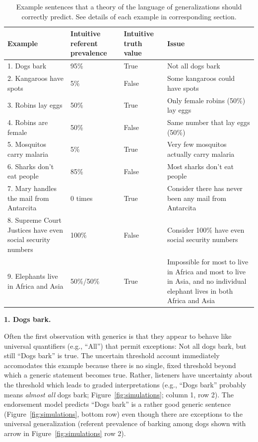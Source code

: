 \documentclass[english,,man,floatsintext]{apa6}
\theoremstyle{definition}
\theoremstyle{definition}
\theoremstyle{definition}
\theoremstyle{remark}
\begin{document}
\begin{table}[ht]
\centering
\begingroup\fontsize{9pt}{10pt}\selectfont
\begin{tabular}{p{2in}|  |p{1.25in}|p{0.75in}|p{2in} |}
  \hline
{\bfseries Example} & {\bfseries Intuitive referent prevalence} & {\bfseries Intuitive truth value} & {\bfseries Issue} \\ 
  \hline
1. Dogs bark & 95\% & True & Not all dogs bark \\ 
   \hline
2. Kangaroos have spots & 5\% & False & Some kangaroos could have spots \\ 
   \hline
3. Robins lay eggs & 50\% & True & Only female robins (50\%) lay eggs \\ 
   \hline
4. Robins are female & 50\% & False & Same number that lay eggs (50\%) \\ 
   \hline
5. Mosquitos carry malaria & 5\% & True & Very few mosquitos actually carry malaria \\ 
   \hline
6. Sharks don't eat people & 85\% & False & Most sharks don't eat people \\ 
   \hline
7. Mary handles the mail from Antarcita & 0 times & True & Consider there has never been any mail from Antarcita \\ 
   \hline
8. Supreme Court Justices have even social security numbers & 100\% & False & Consider 100\% have even social security numbers \\ 
   \hline
9. Elephants live in Africa and Asia & 50\%/50\% & True & Impossible for most to live in Africa and most to live in Asia, and no individual elephant lives in both Africa and Asia \\ 
   \hline
\end{tabular}
\endgroup
\caption{Example sentences that a theory of the language of generalizations should correctly predict. See details of each example in corresponding section.} 
\end{table}

\textbf{1. Dogs bark.}

Often the first observation with generics is that they appear to behave
like universal quantifiers (e.g., \enquote{All}) that permit exceptions:
Not all dogs bark, but still \enquote{Dogs bark} is true. The uncertain
threshold account immediately accomodates this example because there is
no single, fixed threshold beyond which a generic statement becomes
true. Rather, listeners have uncertainty about the threshold which leads
to graded interpretations (e.g., \enquote{Dogs bark} probably means
\emph{almost all} dogs bark; Figure~\ref{fig:simulations}; column 1, row
2). The endorsement model predicts \enquote{Dogs bark} is a rather good
generic sentence (Figure~\ref{fig:simulations}, bottom row) even though
there are exceptions to the universal generalization (referent
prevalence of barking among dogs shown with arrow in
Figure~\ref{fig:simulations} row 2).
\end{document}
